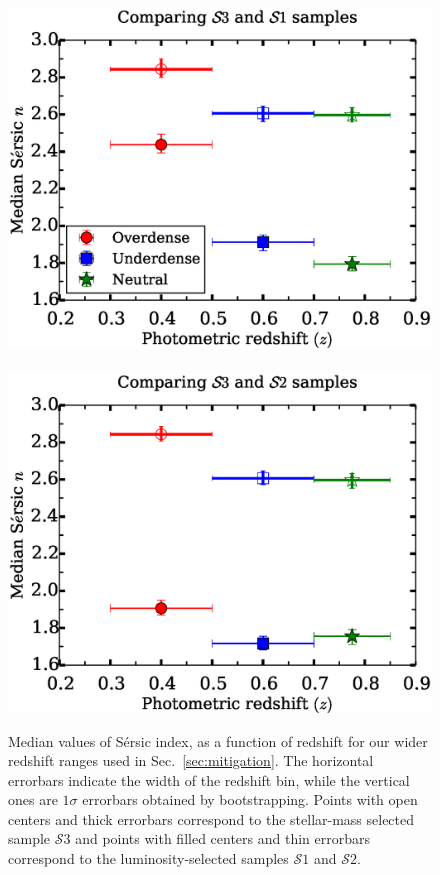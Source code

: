 \documentclass[twocolumn,useAMS,usenatbib]{mn2e}
\newcommand{\sersic}{S\'{e}rsic }
\newcommand{\s}{\ensuremath{\mathcal{S}}}
\begin{document}
\begin{figure}
 \centering
 \includegraphics[width=1.0\columnwidth]{median_sersicn_wide} \
 \includegraphics[width=1.0\columnwidth]{median_sersicn2_wide} 
 \caption{ Median values of \sersic index, as a function of redshift
   for our wider redshift ranges used in Sec.~\ref{sec:mitigation}. The horizontal errorbars indicate
           the width of the redshift bin, while the vertical ones are $1\sigma$ errorbars obtained by
           bootstrapping. Points with open centers and thick errorbars correspond to the stellar-mass selected sample \s$3$
           and points with filled centers and thin errorbars correspond to the luminosity-selected samples \s$1$ and \s$2$.    
         }
 \label{fig:median_sersicn_wide}
\end{figure}
\end{document}
